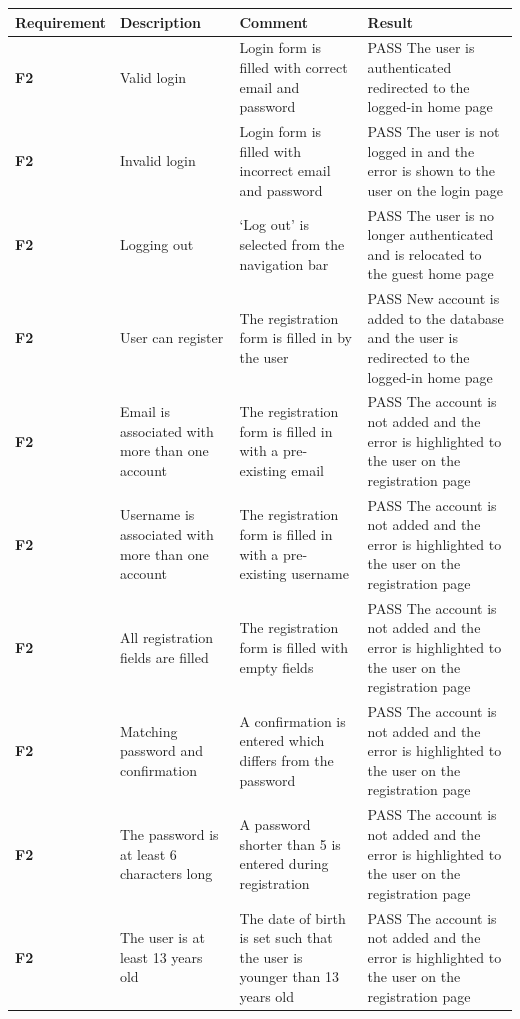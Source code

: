 \begin{longtabu} to \textwidth {XXXX}
\hline
Requirement & Description & Comment & Result \\ 
\hline
\textbf{F2} & Valid login & Login form is filled with correct email and password & \textcolor{passgreen}{PASS} The user is authenticated redirected to the logged-in home page\\
\textbf{F2} & Invalid login & Login form is filled with incorrect email and password & \textcolor{passgreen}{PASS} The user is not logged in and the error is shown to the user on the login page\\
\textbf{F2} & Logging out & `Log out' is selected from the navigation bar & \textcolor{passgreen}{PASS} The user is no longer authenticated and is relocated to the guest home page\\
\textbf{F2} & User can register & The registration form is filled in by the user & \textcolor{passgreen}{PASS} New account is added to the database and the user is redirected to the logged-in home page\\
\textbf{F2} & Email is associated with more than one account & The registration form is filled in with a pre-existing email & \textcolor{passgreen}{PASS} The account is not added and the error is highlighted to the user on the registration page\\
\textbf{F2} & Username is associated with more than one account & The registration form is filled in with a pre-existing username & \textcolor{passgreen}{PASS} The account is not added and the error is highlighted to the user on the registration page\\
\textbf{F2} & All registration fields are filled & The registration form is filled with empty fields & \textcolor{passgreen}{PASS} The account is not added and the error is highlighted to the user on the registration page\\
\textbf{F2} & Matching password and confirmation & A confirmation is entered which differs from the password & \textcolor{passgreen}{PASS} The account is not added and the error is highlighted to the user on the registration page\\
\textbf{F2} & The password is at least 6 characters long & A password shorter than 5 is entered during registration & \textcolor{passgreen}{PASS} The account is not added and the error is highlighted to the user on the registration page\\
\textbf{F2} & The user is at least 13 years old & The date of birth is set such that the user is younger than 13 years old & \textcolor{passgreen}{PASS} The account is not added and the error is highlighted to the user on the registration page\\

\end{longtabu}

